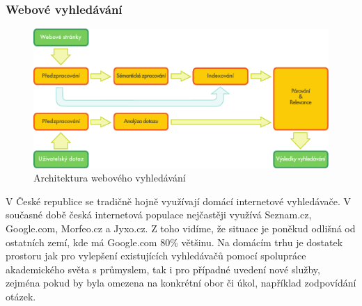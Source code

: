 \documentclass[]{../../metanetpaper}
\begin{document}
\begin{multicols}{2}
\subsubsection{Webové vyhledávání}
\begin{figure}[htb]
  \center
  \includegraphics[width=\textwidth]{../_media/czech/web_search_architecture}
  \caption{Architektura webového vyhledávání}
  \label{fig:websearcharch_en}
 \end{figure}
V České republice se tradičně hojně využívají domácí internetové vyhledávače. V současné době česká internetová populace nejčastěji využívá Seznam.cz, Google.com, Morfeo.cz a Jyxo.cz. Z toho vidíme, že situace je poněkud odlišná od ostatních zemí, kde má Google.com 80\% většinu. Na domácím trhu je dostatek prostoru jak pro vylepšení existujících vyhledávačů pomocí spolupráce akademického světa s průmyslem, tak i pro případné uvedení nové služby, zejména pokud by byla omezena na konkrétní obor či úkol, například zodpovídání otázek.


\end{multicols}
\end{document}
